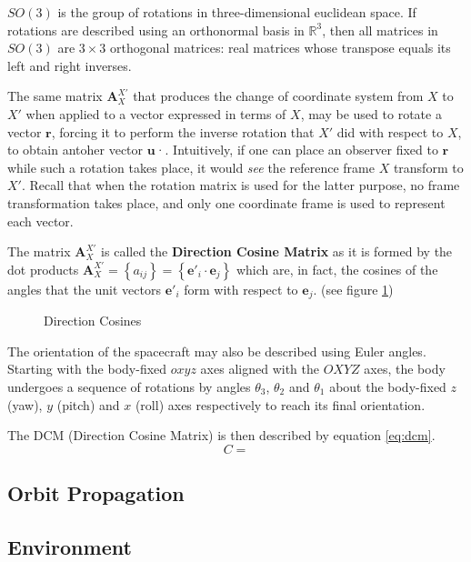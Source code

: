  $SO(3)$ is the group of rotations in three-dimensional euclidean space. If rotations are described using an orthonormal basis in $\mathbb{R}^3$, then all matrices in $SO(3)$ are $3\times 3$ orthogonal matrices: real matrices whose transpose equals its left and right inverses.

The same matrix $\mathbf{A}_X^{X'}$ that produces the change of coordinate system from $X$ to $X'$ when applied to a vector expressed in terms of $X$, may be used to rotate a vector $\mathbf{r}$, forcing it to perform the inverse rotation that $X'$ did with respect to $X$, to obtain antoher vector $\mathbf{u}$·. Intuitively, if one can place an observer fixed to $\mathbf{r}$ while such a rotation takes place, it would \textit{see} the reference frame $X$ transform to $X'$. Recall that when the rotation matrix is used for the latter purpose, no frame transformation takes place, and only one coordinate frame is used to represent each vector.


The matrix $\mathbf{A}_X^{X'}$ is called the \textbf{Direction Cosine Matrix} as it is formed by the dot products $\mathbf{A}_X^{X'} = \left\lbrace a_{ij} \right\rbrace = \left\lbrace \mathbf{e}'_i \cdot \mathbf{e}_j \right\rbrace $ which are, in fact, the cosines of the angles that the unit vectors $\mathbf{e}'_i$ form with respect to $\mathbf{e}_j$. (see figure \ref{fig:frameCosines})
	
	
\begin{figure}
	\centering
	\caption{Direction Cosines}
	\label{fig:frameCosines}
\end{figure}

The orientation of the spacecraft may also be described using Euler angles.
Starting with the body-fixed $oxyz$ axes aligned with the $OXYZ$ axes, the body undergoes a sequence of rotations by angles $\theta_3$, $\theta_2$ and $\theta_1$ about the body-fixed $z$ (yaw), $y$ (pitch) and $x$ (roll) axes respectively to reach its final orientation.

The DCM (Direction Cosine Matrix) is then described by equation \ref{eq:dcm}.
\begin{equation} \label{eq:dcm}
C = 
\end{equation}

\subsection{Orbit Propagation}

\subsection{Environment}

